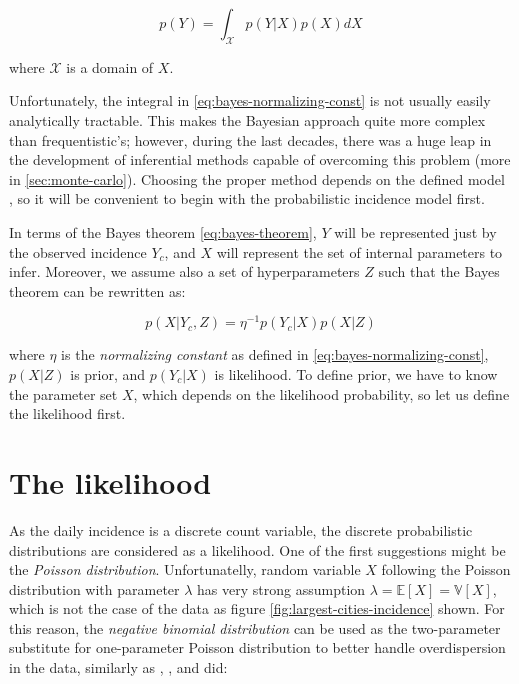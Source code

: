 \documentclass[
  digital, %
  oneside, %
  lof,     %
  lot,     %
]{fithesis4}
\begin{document}
\begin{equation}\label{eq:bayes-normalizing-const}
  p(Y) = \int_\mathcal{X} p( Y | X ) p(X) dX
\end{equation}

where $\mathcal{X}$ is a domain of $X$.

Unfortunately, the integral in \eqref{eq:bayes-normalizing-const} is not usually easily analytically tractable.
This makes the Bayesian approach quite more complex than frequentistic's; however, during the last decades, there was a huge leap in the development of inferential methods capable of overcoming this problem (more in \autoref{sec:monte-carlo}). 
Choosing the proper method depends on the defined model \cite{pfeffer2016}, so it will be convenient to begin with the probabilistic incidence model first.


In terms of the Bayes theorem \eqref{eq:bayes-theorem}, $Y$ will be represented just by the observed incidence $Y_c$, and $X$ will represent the set of internal parameters to infer.
Moreover, we assume also a set of hyperparameters $Z$ such that the Bayes theorem can be rewritten as:

\begin{equation}\label{eq:bayes-theorem-customized}
  p( X | Y_c, Z ) = \eta^{-1} p( Y_c | X ) p(X | Z)
\end{equation}

where $\eta$ is the \textit{normalizing constant} as defined in \eqref{eq:bayes-normalizing-const}, $p(X | Z)$ is prior, and $p( Y_c | X )$ is likelihood.
To define prior, we have to know the parameter set $X$, which depends on the likelihood probability, so let us define the likelihood first.


\section{The likelihood}

As the daily incidence is a discrete count variable, the discrete probabilistic distributions are considered as a likelihood. One of the first suggestions might be the \textit{Poisson distribution}.
Unfortunatelly, random variable $X$ following the Poisson distribution with parameter $\lambda$ has very strong assumption $\lambda = \mathbb{E}\left[ X \right] = \mathbb{V}\left[ X \right]$, which is not the case of the data as figure \ref{fig:largest-cities-incidence} shown. 
For this reason, the \textit{negative binomial distribution} can be used as the two-parameter substitute for one-parameter Poisson distribution to better handle overdispersion in the data, similarly as \cite{simone2020}, \cite{wallinga2004}, \cite{alzahrani2018} and \cite{manevski2020} did:
\end{document}
